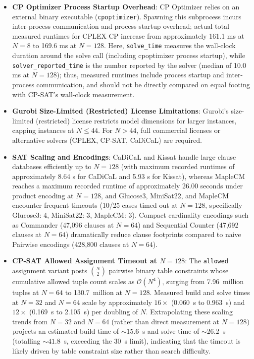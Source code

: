 \documentclass[a4paper,fleqn]{cas-sc}
\begin{document}
\begin{itemize}
    \item \textbf{CP Optimizer Process Startup Overhead}: CP Optimizer relies on an external binary executable (\texttt{cpoptimizer}). Spawning this subprocess incurs inter-process communication and process startup overhead; actual total measured runtimes for CPLEX CP increase from approximately 161.1 ms at $N = 8$ to 169.6 ms at $N = 128$. Here, \texttt{solve\_time} measures the wall-clock duration around the solve call (including cpoptimizer process startup), while \texttt{solver\_reported\_time} is the number reported by the solver (median of 10.0 ms at $N = 128$); thus, measured runtimes include process startup and inter-process communication, and should not be directly compared on equal footing with CP-SAT's wall-clock measurement.
    \item \textbf{Gurobi Size-Limited (Restricted) License Limitations}: Gurobi's size-limited (restricted) license restricts model dimensions for larger instances, capping instances at $N \le 44$. For $N > 44$, full commercial licenses or alternative solvers (CPLEX, CP-SAT, CaDiCaL) are required.
    \item \textbf{SAT Scaling and Encodings}: CaDiCaL and Kissat handle large clause databases efficiently up to $N = 128$ (with maximum recorded runtimes of approximately 8.64 s for CaDiCaL and 5.93 s for Kissat), whereas MapleCM reaches a maximum recorded runtime of approximately 26.00 seconds under product encoding at $N = 128$, and Glucose3, MiniSat22, and MapleCM encounter frequent timeouts (10/25 cases timed out at $N = 128$, specifically Glucose3: 4, MiniSat22: 3, MapleCM: 3). Compact cardinality encodings such as Commander (47,096 clauses at $N = 64$) and Sequential Counter (47,692 clauses at $N = 64$) dramatically reduce clause footprints compared to naive Pairwise encodings (428,800 clauses at $N = 64$).
    \item \textbf{CP-SAT Allowed Assignment Timeout at $N = 128$}: The \texttt{allowed} assignment variant posts $\binom{N}{2}$ pairwise binary table constraints whose cumulative allowed tuple count scales as $\mathcal{O}(N^4)$, surging from 7.96~million tuples at $N = 64$ to 130.7~million at $N = 128$. Measured build and solve times at $N = 32$ and $N = 64$ scale by approximately $16\times$ (0.060~s to 0.963~s) and $12\times$ (0.169~s to 2.105~s) per doubling of $N$. Extrapolating these scaling trends from $N = 32$ and $N = 64$ (rather than direct measurement at $N = 128$) projects an estimated build time of $\sim 15.6$~s and solve time of $\sim 26.2$~s (totalling $\sim 41.8$~s, exceeding the 30~s limit), indicating that the timeout is likely driven by table constraint size rather than search difficulty.
\end{itemize}
\end{document}
